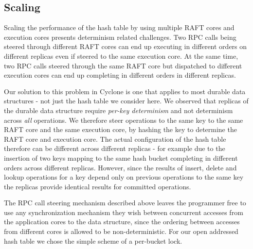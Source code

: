 \documentclass[twocolumn]{article}
\begin{document}
\subsection{Scaling}
Scaling the performance of the hash table by using multiple RAFT cores and
execution cores presents determinism related challenges. Two RPC calls being
steered through different RAFT cores can end up executing in different orders on
different replicas even if steered to the same execution core. At the same time,
two RPC calls steered through the same RAFT core but dispatched to different
execution cores can end up completing in different orders in different replicas.

Our solution to this problem in Cyclone is one that applies to most durable
data structures - not just the hash table we consider here. We observed that
replicas of the durable data structure require \emph{per-key determinism}
and not determinism across \emph{all} operations. We therefore steer
operations to the same key to the same RAFT core and the same execution core, by
hashing the key to determine the RAFT core and execution core. The actual
configuration of the hash table therefore can be different across different
replicas - for example due to the insertion of two keys mapping to the same hash
bucket completing in different orders across different replicas. However, since the
results of insert, delete and lookup operations for a key depend only on
previous operations to the same key the replicas provide identical results for
committed operations.

The RPC call steering mechanism described above leaves the programmer free to
use any synchronization mechanism they wish between concurrent accesses from the
application cores to the data structure, since the ordering between accesses
from different cores is allowed to be non-deterministic. For our open addressed
hash table we chose the simple scheme of a per-bucket lock.
\end{document}
